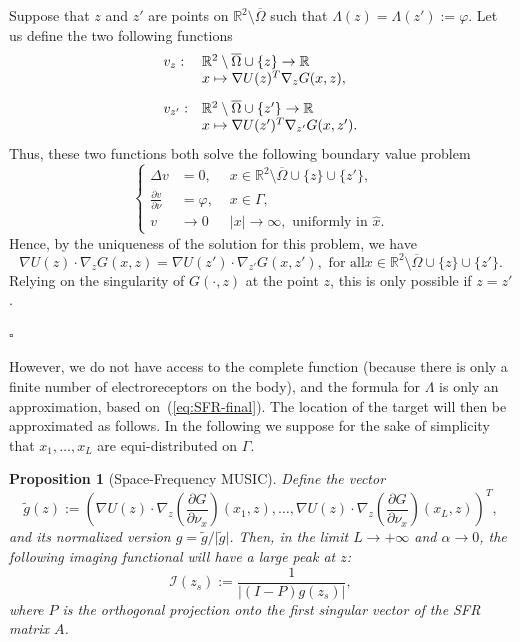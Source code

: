\documentclass[final]{siamltex}
\newcommand{\nm}{\noalign{\smallskip}}
\numberwithin{equation}{section}
\numberwithin{figure}{section}
\numberwithin{table}{section}
\newcommand{\cqfd}{\hfill $\square$}
\newtheorem{prop}{Proposition}
\begin{document}
Suppose that $z$ and $z'$ are points on
$\mathbb{R}^{2}\setminus\overline{\Omega}$ such that
$\Lambda(z)=\Lambda(z'):=\varphi$. Let us define the two following
functions
\[
\begin{array}{ll}v_{z}: &\mathbb{R}^{2}\setminus\overline{\Omega}\cup\{z\} \rightarrow \mathbb{R}\\
& x \mapsto  \nabla U(z)^T \nabla_{z}G(x,z),
\\
\nm \nm \nm
v_{z'}: & \mathbb{R}^{2}\setminus\overline{\Omega}\cup\{z'\} \rightarrow  \mathbb{R}\\
& x \mapsto  \nabla U(z')^T \nabla_{z'}G(x,z').
\end{array}
\]
Thus, these two functions both solve the following boundary value
problem
\[
\left\{ \begin{alignedat}{2}\Delta v & =0, & \,\, x\in\mathbb{R}^{2}\setminus\overline{\Omega}\cup\{z\}\cup\{z'\},\\
\frac{\partial v}{\partial\nu} & =\varphi, & \,\, x\in\Gamma,\\
v & \rightarrow0 & \,\,\left|x\right|\rightarrow\infty,\text{ uniformly in }\hat{x}.
\end{alignedat}
\right.
\]
Hence, by the uniqueness of the solution for this problem, we have
\[
\nabla U(z)\cdot\nabla_{z}G(x,z)=\nabla
U(z')\cdot\nabla_{z'}G(x,z'),\mbox{ for all
}x\in\mathbb{R}^{2}\setminus\overline{\Omega}\cup\{z\}\cup\{z'\}.
\]
Relying on the singularity of $G(\cdot,z)$ at the point $z$, this
is only possible if $z=z'$.

\cqfd

However, we do not have access to the complete function (because
there is only a finite number of electroreceptors on the body),
and the formula for $\Lambda$ is only an approximation, based
on~(\ref{eq:SFR-final}). The location of the target will then be
approximated as follows. In the following we suppose for the sake
of simplicity that $x_1,\ldots, x_L$ are equi-distributed on
$\Gamma$.

\begin{prop}[Space-Frequency MUSIC]

\label{prop:SF-MUSIC} Define the vector
\begin{equation}
\tilde{g}(z):=\left(\nabla U(z)\cdot\nabla_{z}\left(\frac{\partial
G}{\partial\nu_{x}}\right)(x_{1},z),\ldots,\nabla
U(z)\cdot\nabla_{z}\left(\frac{\partial
G}{\partial\nu_{x}}\right)(x_{L},z)\right)^{T},\label{eq:illumination-vector-disk}
\end{equation}
and its normalized version $g=\tilde{g}/\vert\tilde{g}\vert$.
Then, in the limit $L\rightarrow+\infty$ and $\alpha
\rightarrow0$, the following imaging functional will have a large
peak at $z$:
\begin{equation}
\mathcal{I}(z_{s}):=\frac{1}{\left|(I-P)g(z_{s})\right|},\label{eq:imaging_functional}
\end{equation}
 where $P$ is the orthogonal projection onto the first
singular vector of the SFR matrix $A$.

\end{prop}
\end{document}
